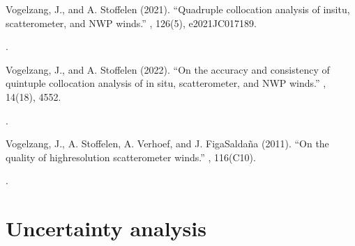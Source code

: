 \documentclass[a4paper,10pt,english]{sphinxmanual}
\begin{document}
\label{\detokenize{alg-02-validation:ref-vogelzang-quadruple-collocation}}
\sphinxAtStartPar
Vogelzang, J., and A. Stoffelen (2021). “Quadruple collocation analysis of
in\sphinxhyphen{}situ, scatterometer, and NWP winds.” , 126(5), e2021JC017189.
%
\begin{footnote}[8]\sphinxAtStartFootnote
{}
%
\end{footnote}.

\label{\detokenize{alg-02-validation:ref-vogelzang-quintuple-collocation}}
\sphinxAtStartPar
Vogelzang, J., and A. Stoffelen (2022). “On the accuracy and consistency of
quintuple collocation analysis of in situ, scatterometer, and NWP winds.”
, 14(18), 4552.
%
\begin{footnote}[9]\sphinxAtStartFootnote
{}
%
\end{footnote}.

\label{\detokenize{alg-02-validation:ref-vogelzang-spectral}}
\sphinxAtStartPar
Vogelzang, J., A. Stoffelen, A. Verhoef, and J. Figa\sphinxhyphen{}Saldaña (2011). “On the
quality of high\sphinxhyphen{}resolution scatterometer winds.” , 116(C10).
%
\begin{footnote}[10]\sphinxAtStartFootnote
{}
%
\end{footnote}.

\sphinxstepscope


\chapter{Uncertainty analysis}
\label{\detokenize{04_uncertainty_analysis:uncertainty-analysis}}\label{\detokenize{04_uncertainty_analysis::doc}}
\end{document}
